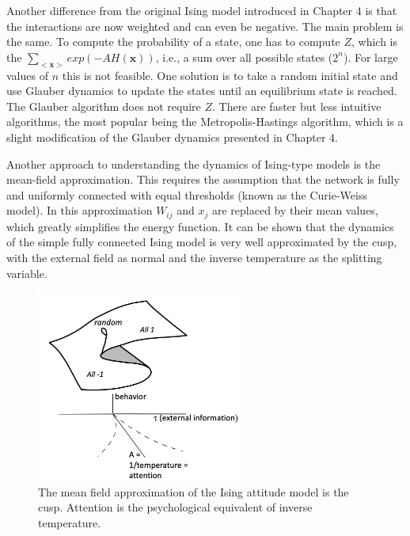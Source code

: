 \documentclass[
  letterpaper,
]{scrbook}
\begin{document}
Another difference from the original Ising model introduced in Chapter 4
is that the interactions are now weighted and can even be negative. The
main problem is the same. To compute the probability of a state, one has
to compute \(Z\), which is the
\(\sum_{< \mathbf{x} >}^{}{exp( - AH\left( \mathbf{x} \right))}\), i.e.,
a sum over all possible states (\(2^{n}\)). For large values of \(n\)
this is not feasible. One solution is to take a random initial state and
use Glauber dynamics to update the states until an equilibrium state is
reached. The Glauber algorithm does not require \(Z\). There are faster
but less intuitive algorithms, the most popular being the
Metropolis-Hastings algorithm, which is a slight modification of the
Glauber dynamics presented in Chapter 4.

Another approach to understanding the dynamics of Ising-type models is
the mean-field approximation. This requires the assumption that the
network is fully and uniformly connected with equal thresholds (known as
the Curie-Weiss model). In this approximation \(W_{ij}\) and \(x_{j}\)
are replaced by their mean values, which greatly simplifies the energy
function. It can be shown that the dynamics of the simple fully
connected Ising model is very well approximated by the cusp, with the
external field as normal and the inverse temperature as the splitting
variable.

\begin{figure}

{\centering \includegraphics[width=2.71903in,height=\textheight]{media/ch6/image11.jpg}

}

\caption{\label{fig-ch6-img11-old-80}The mean field approximation of the
Ising attitude model is the cusp. Attention is the psychological
equivalent of inverse temperature.}

\end{figure}
\end{document}
